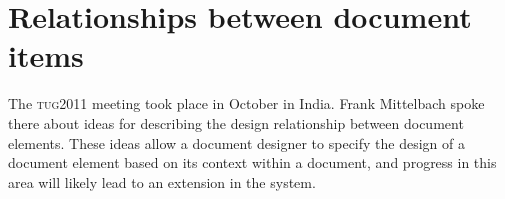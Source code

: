 \documentclass{ltnews}
\begin{document}
\section{Relationships between document items}

The \textsc{tug}2011 meeting took place in October in India. Frank Mittelbach
spoke there about ideas for describing the design relationship between document elements.
These ideas allow a document designer to specify the design of a document element
based on its context within a document, and progress in this area will likely
lead to an extension in the  system.
\end{document}
